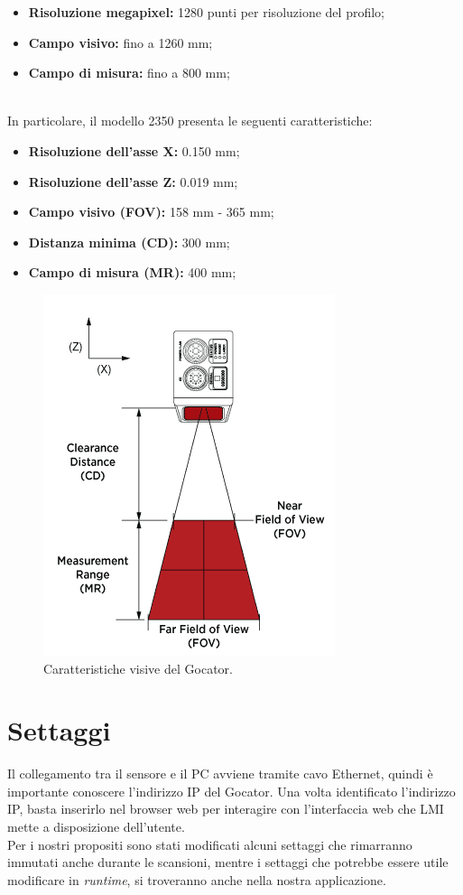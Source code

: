 \begin{itemize}
	\item \textbf{Risoluzione megapixel:} 1280 punti per risoluzione del profilo;
	\item \textbf{Campo visivo:} fino a 1260 mm;
	\item \textbf{Campo di misura:} fino a 800 mm;
\end{itemize}

\ \\
\noindent In particolare, il modello 2350 presenta le seguenti caratteristiche: 

\begin{itemize}
	\item \textbf{Risoluzione dell'asse X:} 0.150 mm;
	\item \textbf{Risoluzione dell'asse Z:} 0.019 mm;
	\item \textbf{Campo visivo (FOV):} 158 mm - 365 mm;
	\item \textbf{Distanza minima (CD):} 300 mm;
	\item \textbf{Campo di misura (MR):} 400 mm;
\end{itemize}

\begin{figure}[H]
	\centering
	\includegraphics[scale=0.60]{./pictures/gocator_2.png}
	\caption{Caratteristiche visive del Gocator.}\label{fig:gocator_2}
\end{figure}

\section{Settaggi}
Il collegamento tra il sensore e il PC avviene tramite cavo Ethernet, quindi è importante conoscere l'indirizzo IP del Gocator. Una volta identificato l'indirizzo IP, basta inserirlo nel browser web per interagire con l'interfaccia web che LMI mette a disposizione dell'utente.\\
\newline
Per i nostri propositi sono stati modificati alcuni settaggi che rimarranno immutati anche durante le scansioni, mentre i settaggi che potrebbe essere utile modificare in \textit{runtime}, si troveranno anche nella nostra applicazione.

